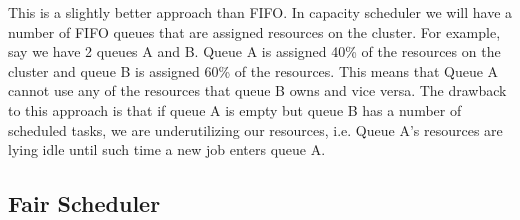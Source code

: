 This is a slightly better approach than FIFO. In capacity scheduler we will have a number of FIFO queues that are assigned resources on the cluster. For example, say we have 2 queues A and B. Queue A is assigned 40\% of the resources on the cluster and queue B is assigned 60\% of the resources. This means that Queue A cannot use any of the resources that queue B owns and vice versa. 
The drawback to this approach is that if queue A is empty but queue B has a number of scheduled tasks, we are underutilizing our resources, i.e. Queue A's resources are lying idle until such time a new job enters queue A.

\subsection{Fair Scheduler}



